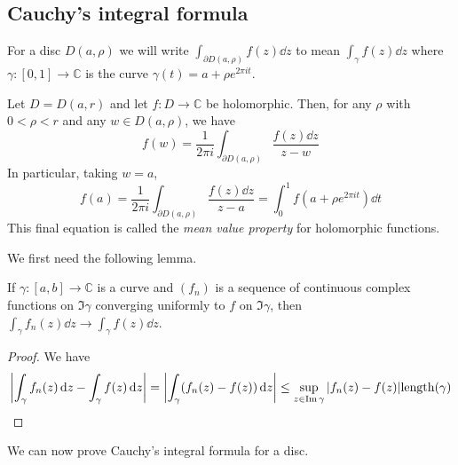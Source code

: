 \subsection{Cauchy's integral formula}
For a disc \( D(a,\rho) \) we will write \( \int_{\partial D(a,\rho)} f(z) \dd{z} \) to mean \( \int_\gamma f(z) \dd{z} \) where \( \gamma \colon [0,1] \to \mathbb C \) is the curve \( \gamma(t) = a+\rho e^{2\pi i t} \).
\begin{theorem}
	Let \( D = D(a,r) \) and let \( f \colon D \to \mathbb C \) be holomorphic.
	Then, for any \( \rho \) with \( 0 < \rho < r \) and any \( w \in D(a,\rho) \), we have
	\[
		f(w) = \frac{1}{2\pi i} \int_{\partial D(a,\rho)} \frac{f(z) \dd{z}}{z-w}
	\]
	In particular, taking \( w = a \),
	\[
		f(a) = \frac{1}{2\pi i} \int_{\partial D(a,\rho)} \frac{f(z) \dd{z}}{z-a} = \int_0^1 f(a+\rho e^{2\pi i t}) \dd{t}
	\]
	This final equation is called the \textit{mean value property} for holomorphic functions.
\end{theorem}
We first need the following lemma.
\begin{lemma}
	If \( \gamma \colon [a,b] \to \mathbb C \) is a curve and \( (f_n) \) is a sequence of continuous complex functions on \( \Im \gamma \) converging uniformly to \( f \) on \( \Im\gamma \), then \( \int_\gamma f_n(z) \dd{z} \to \int_\gamma f(z) \dd{z} \).
\end{lemma}
\begin{proof}
	We have
	\[
		\abs{\int_\gamma f_n(z) \dd{z} - \int_\gamma f(z) \dd{z}} = \abs{\int_\gamma (f_n(z) - f(z)) \dd{z}} \leq \sup_{z \in \Im \gamma} \abs{f_n(z) - f(z)} \mathrm{length}(\gamma)
	\]
\end{proof}
We can now prove Cauchy's integral formula for a disc.
